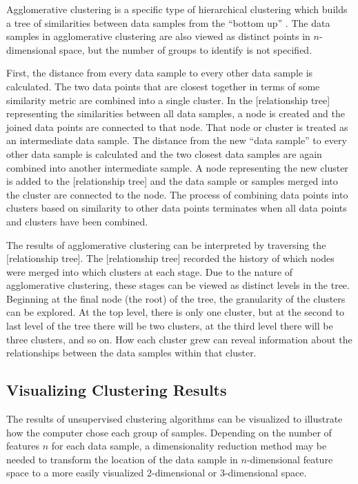 Agglomerative clustering is a specific type of hierarchical clustering which builds a tree of similarities between data samples from the ``bottom up'' \cite{Ward1963}. The data samples in agglomerative clustering are also viewed as distinct points in $n$-dimensional space, but the number of groups to identify is not specified. 

First, the distance from every data sample to every other data sample is calculated. The two data points that are closest together in terms of some similarity metric are combined into a single cluster. In the [relationship tree] representing the similarities between all data samples, a node is created and the joined data points are connected to that node. That node or cluster is treated as an intermediate data sample. The distance from the new ``data sample'' to every other data sample is calculated and the two closest data samples are again combined into another intermediate sample. A node representing the new cluster is added to the [relationship tree] and the data sample or samples merged into the cluster are connected to the node. The process of combining data points into clusters based on similarity to other data points terminates when all data points and clusters have been combined. 

The results of agglomerative clustering can be interpreted by traversing the [relationship tree]. The [relationship tree] recorded the history of which nodes were merged into which clusters at each stage. Due to the nature of agglomerative clustering, these stages can be viewed as distinct levels in the tree. Beginning at the final node (the root) of the tree, the granularity of the clusters can be explored. At the top level, there is only one cluster, but at the second to last level of the tree there will be two clusters, at the third level there will be three clusters, and so on. How each cluster grew can reveal information about the relationships between the data samples within that cluster.

\subsection{Visualizing Clustering Results} 

The results of unsupervised clustering algorithms can be visualized to illustrate how the computer chose each group of samples. Depending on the number of features $n$ for each data sample, a dimensionality reduction method may be needed to transform the location of the data sample in $n$-dimensional feature space to a more easily visualized 2-dimensional or 3-dimensional space.

